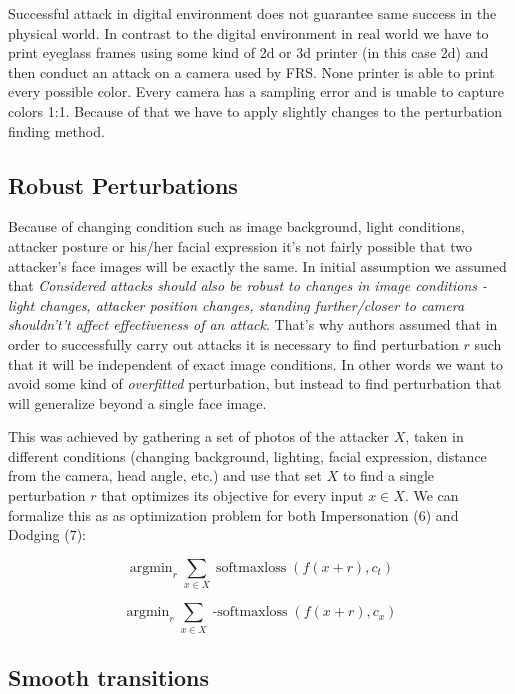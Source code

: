 Successful attack in digital environment does not guarantee same success in the physical world. In contrast to the digital environment in real world we have to print eyeglass frames using some kind of 2d or 3d printer (in this case 2d) and then conduct an attack on a camera used by FRS. None printer is able to print every possible color. Every camera has a sampling error and is unable to capture colors 1:1. Because of that we have to apply slightly changes to the perturbation finding method.


\subsection{Robust Perturbations}
Because of changing condition such as image background, light conditions, attacker posture or his/her facial expression it's not fairly possible that two attacker's face images will be exactly the same. In initial assumption we assumed that \textit{Considered attacks should also be robust to changes in image conditions - light changes, attacker position changes, standing further/closer to camera shouldn't’t affect effectiveness of an attack}. That's why authors assumed that in order to successfully carry out attacks it is necessary to find perturbation $r$ such that it will be independent of exact image conditions. In other words we want to avoid some kind of \textit{overfitted} perturbation, but instead to find perturbation that will generalize beyond a single face image.

This was achieved by gathering a set of photos of the attacker $X$, taken in different conditions (changing background, lighting, facial expression, distance from the camera, head angle, etc.) and use that set $X$ to find a single perturbation $r$ that optimizes its objective for every input $x \in X$. We can formalize this as as optimization problem for both Impersonation (6) and Dodging (7):


\begin{equation}
\operatorname{argmin}_{r} \sum_{x \in X} \operatorname{softmaxloss}(f(x+r), c_t)
\end{equation}


\begin{equation}
\operatorname{argmin}_{r} \sum_{x \in X} \operatorname{- softmaxloss}(f(x+r), c_x)
\end{equation}

\subsection{Smooth transitions}

